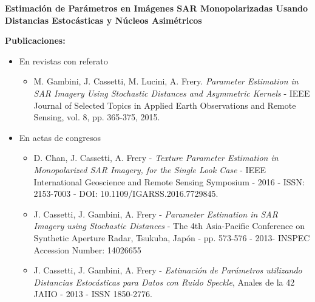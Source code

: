 	\vspace{1cm}
	
	\noindent\makebox[\linewidth]{\rule{15 cm}{1.5pt}}
	\begin{center}
		\textbf{{\LARGE Estimación de Parámetros en Imágenes SAR Monopolarizadas Usando Distancias Estocásticas y Núcleos Asimétricos}}
	\end{center}
	\noindent\makebox[\linewidth]{\rule{15 cm}{1.5pt}}
	
	\vspace{1cm}


\textbf{Publicaciones:}
\begin{itemize}
	\item En revistas con referato
	\begin{itemize}
		\item M. Gambini, J. Cassetti, M. Lucini, A. Frery. \emph{Parameter Estimation in SAR Imagery Using Stochastic Distances and Asymmetric Kernels} - IEEE Journal of Selected Topics in Applied Earth Observations and Remote Sensing, vol. 8, pp. 365-375, 2015.
	\end{itemize}
	\item En actas de congresos
	\begin{itemize}
		\item  D. Chan, J. Cassetti, A. Frery - \emph{Texture Parameter Estimation in Monopolarized SAR Imagery, for the Single Look Case} - IEEE International Geoscience and Remote Sensing Symposium - 2016 - ISSN: 2153-7003 -  DOI: 10.1109/IGARSS.2016.7729845.
		
		\item J. Cassetti, J. Gambini, A. Frery - \emph{Parameter Estimation in SAR Imagery using Stochastic Distances} - The 4th Asia-Pacific Conference on Synthetic Aperture Radar, Tsukuba, Japón - pp. 573-576 - 2013- INSPEC Accession Number: 14026655 
		
		\item J. Cassetti, J. Gambini, A. Frery - \emph{Estimación de Parámetros utilizando Distancias Estocásticas para Datos con Ruido Speckle}, Anales de la 42 JAIIO - 2013 - ISSN 1850-2776.
	\end{itemize}
\end{itemize}

